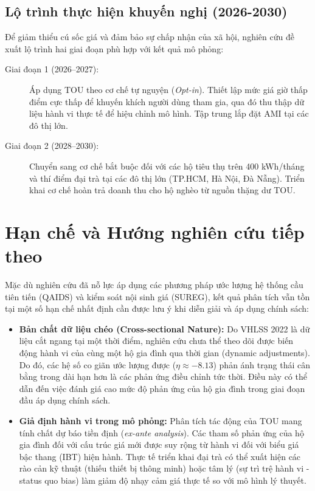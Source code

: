 \documentclass[12pt,a4paper,oneside]{article}
\begin{document}
\subsection{Lộ trình thực hiện khuyến nghị (2026-2030)}

Để giảm thiểu cú sốc giá và đảm bảo sự chấp nhận của xã hội, nghiên cứu đề xuất lộ trình hai giai đoạn phù hợp với kết quả mô phỏng:

\begin{description}
	\item[Giai đoạn 1 (2026--2027):] Áp dụng TOU theo cơ chế tự nguyện (\textit{Opt-in}). Thiết lập mức giá giờ thấp điểm cực thấp để khuyến khích người dùng tham gia, qua đó thu thập dữ liệu hành vi thực tế để hiệu chỉnh mô hình. Tập trung lắp đặt AMI tại các đô thị lớn.
	\item[Giai đoạn 2 (2028--2030):] Chuyển sang cơ chế bắt buộc đối với các hộ tiêu thụ trên 400 kWh/tháng và thí điểm đại trà tại các đô thị lớn (TP.HCM, Hà Nội, Đà Nẵng). Triển khai cơ chế hoàn trả doanh thu cho hộ nghèo từ nguồn thặng dư TOU.
\end{description}
	
\section{Hạn chế và Hướng nghiên cứu tiếp theo}
\label{sec:limitations}

Mặc dù nghiên cứu đã nỗ lực áp dụng các phương pháp ước lượng hệ thống cầu tiên tiến (QAIDS) và kiểm soát nội sinh giá (SUREG), kết quả phân tích vẫn tồn tại một số hạn chế nhất định cần được lưu ý khi diễn giải và áp dụng chính sách:

\begin{itemize}
	\item \textbf{Bản chất dữ liệu chéo (Cross-sectional Nature):} Do VHLSS 2022 là dữ liệu cắt ngang tại một thời điểm, nghiên cứu chưa thể theo dõi được biến động hành vi của cùng một hộ gia đình qua thời gian (dynamic adjustments). Do đó, các hệ số co giãn ước lượng được ($\eta \approx -8.13$) phản ánh trạng thái cân bằng trong dài hạn hơn là các phản ứng điều chỉnh tức thời. Điều này có thể dẫn đến việc đánh giá cao mức độ phản ứng của hộ gia đình trong giai đoạn đầu áp dụng chính sách.
	
	\item \textbf{Giả định hành vi trong mô phỏng:} Phân tích tác động của TOU mang tính chất dự báo tiền định (\textit{ex-ante analysis}). Các tham số phản ứng của hộ gia đình đối với cấu trúc giá mới được suy rộng từ hành vi đối với biểu giá bậc thang (IBT) hiện hành. Thực tế triển khai đại trà có thể xuất hiện các rào cản kỹ thuật (thiếu thiết bị thông minh) hoặc tâm lý (sự trì trệ hành vi - status quo bias) làm giảm độ nhạy cảm giá thực tế so với mô hình lý thuyết.
\end{itemize}
\end{document}
